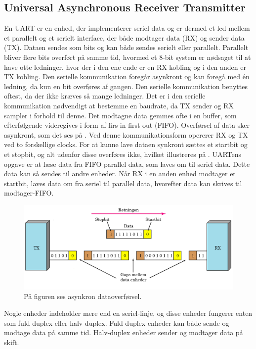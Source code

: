 \subsection{Universal Asynchronous Receiver Transmitter}
En UART er en enhed, der implementerer seriel data og er dermed et led mellem et parallelt og et serielt interface, der både modtager data (RX) og sender data (TX). Dataen sendes som bits og kan både sendes serielt eller parallelt. \citep{Jimb02016a,Chun-zhiYin-shuiLun-yao2011} Parallelt bliver flere bits overført på samme tid, hvormed et 8-bit system er nødsaget til at have otte ledninger, hvor der i den ene ende er en RX kobling og i den anden er TX kobling. \citep{Jimb02016a} Den serielle kommunikation foregår asynkront og kan foregå med én ledning, da kun en bit overføres af gangen. Den serielle kommunikation benyttes oftest, da der ikke kræves så mange ledninger. Det er i den serielle kommunikation nødvendigt at bestemme en baudrate, da TX sender og RX sampler i forhold til denne. Det modtagne data gemmes ofte i en buffer, som efterfølgende videregives i form af firs-in-first-out (FIFO). \citep{Jimb02016a}\newline 
Overførsel af data sker asynkront, som det ses på . Ved denne kommunikationsform opererer RX og TX ved to forskellige clocks. For at kunne lave dataen synkront sættes et startbit og et stopbit, og alt udenfor disse overføres ikke, hvilket illustreres på . UARTens opgave er at læse data fra FIFO parallel data, som laves om til seriel data. Dette data kan så sendes til andre enheder. Når RX i en anden enhed modtager et startbit, laves data om fra seriel til parallel data, hvorefter data kan skrives til modtager-FIFO. \citep{Jimb02016a,Chun-zhiYin-shuiLun-yao2011}
\begin{figure}[H]
	\centering
	\includegraphics[scale=0.6]{figures/bProblemloesning/asynkron.png}
	\caption{På figuren ses asynkron dataoverførsel. \citep{Jimb02016}}
	\label{fig:asynkron}
\end{figure}
Nogle enheder indeholder mere end en seriel-linje, og disse enheder fungerer enten som fuld-duplex eller halv-duplex. Fuld-duplex enheder kan både sende og modtage data på samme tid. Halv-duplex enheder sender og modtager data på skift. \citep{Jimb02016a,Chun-zhiYin-shuiLun-yao2011}
